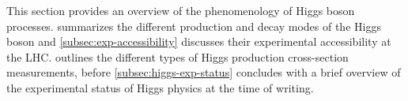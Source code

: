 This section provides an overview of the phenomenology of Higgs boson processes.  summarizes the different production and decay modes of the Higgs boson and \cref{subsec:exp-accessibility} discusses their experimental accessibility at the LHC.  outlines the different types of Higgs production cross-section measurements, before \cref{subsec:higgs-exp-status} concludes with a brief overview of the experimental status of Higgs physics at the time of writing.




